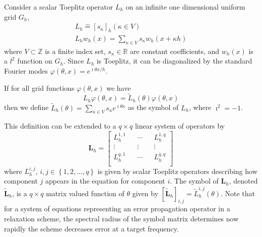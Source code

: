 Consider a scalar Toeplitz operator $L_h$ on an infinite one dimensional uniform grid $G_h$,
\begin{equation}
\begin{split}
L_h \mathrel{\hat{=}} \left[ s_\kappa \right]_h \left( \kappa \in V \right)\\
L_h w_h \left( x \right) = \sum_{\kappa \in V} s_\kappa w_h \left( x + \kappa h \right)
\end{split}
\end{equation}
where $V \subset \mathbb{Z}$ is a finite index set, $s_\kappa \in \mathbb{R}$ are constant coefficients, and $w_h \left( x \right)$ is a $l^2$ function on $G_h$.
Since $L_h$ is Toeplitz, it can be diagonalized by the standard Fourier modes $\varphi \left( \theta, x \right) = e^{\imath \theta x / h}$.

\begin{definition}[Symbol of $L_h$]\label{def:symbol}
If for all grid functions $\varphi \left( \theta, x \right)$ we have
\begin{equation}
L_h \varphi \left( \theta, x \right) = \tilde{L}_h \left( \theta \right) \varphi \left( \theta, x \right)
\end{equation}
then we define $\tilde{L}_h \left( \theta \right) = \sum_{\kappa \in V} s_\kappa e^{\imath \theta \kappa}$ as the symbol of $L_h$, where $\imath^2 = -1$.
\end{definition}

This definition can be extended to a $q \times q$ linear system of operators by
\begin{equation}
\mathbf{L}_h =
\begin{bmatrix}
    L_h^{1, 1} && \cdots && L_h^{1, q}        \\
    \vdots               && \vdots && \vdots  \\
    L_h^{q, 1} && \cdots && L_h^{q, q}        \\
\end{bmatrix}
\end{equation}
where $L_h^{i, j}$, $i, j \in \left\lbrace 1, 2, \dots, q \right\rbrace$ is given by scalar Toeplitz operators describing how component $j$ appears in the equation for component $i$.
The symbol of $\mathbf{L}_h$, denoted $\tilde{\mathbf{L}}_h$, is a $q \times q$ matrix valued function of $\theta$ given by $\left[ \tilde{\mathbf{L}}_h \right]_{i, j} = \tilde{L}_h^{i, j} \left( \theta \right)$.
Note that for a system of equations representing an error propagation operator in a relaxation scheme, the spectral radius of the symbol matrix determines now rapidly the scheme decreases error at a target frequency.

